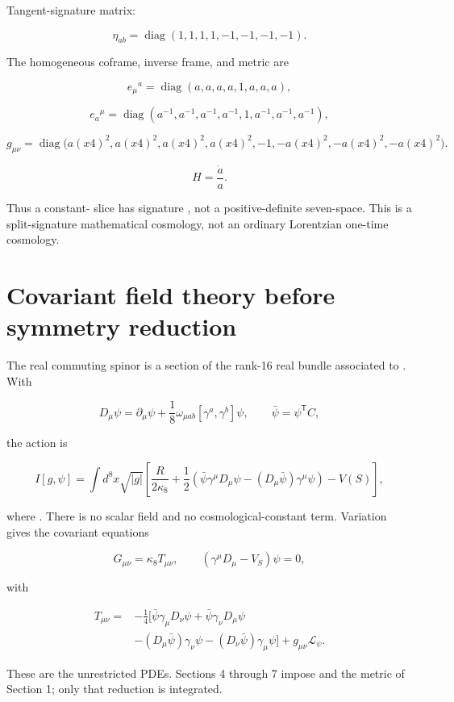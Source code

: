 \documentclass[11pt]{article}
\begin{document}
Tangent-signature matrix:

\[
\eta_{ab}=\operatorname{diag}(1,1,1,1,-1,-1,-1,-1).
\]

The homogeneous coframe, inverse frame, and metric are

\[
e_\mu{}^a=\operatorname{diag}(a,a,a,a,1,a,a,a),
\]

\[
e_a{}^\mu=\operatorname{diag}(a^{-1},a^{-1},a^{-1},a^{-1},1,
a^{-1},a^{-1},a^{-1}),
\]

\[
g_{\mu\nu}=\operatorname{diag}\bigl(a(x4)^2,a(x4)^2,a(x4)^2,a(x4)^2,-1,
-a(x4)^2,-a(x4)^2,-a(x4)^2\bigr).
\]

\[
H=\frac{\dot a}{a}.
\]

Thus a constant-\texttt{} slice has signature \texttt{}, not a positive-definite seven-space. This is a split-signature mathematical cosmology, not an ordinary Lorentzian one-time cosmology.

\section{Covariant field theory before symmetry reduction}

The real commuting spinor is a section of the rank-16 real bundle associated to \texttt{}. With

\[
D_\mu\psi=\partial_\mu\psi+
\frac18\omega_{\mu ab}[\gamma^a,\gamma^b]\psi,
\qquad \bar\psi=\psi^{\mathsf T}C,
\]

the action is

\[
I[g,\psi]=\int d^8x\sqrt{|g|}\left[
\frac{R}{2\kappa_8}
+\frac12\left(\bar\psi\gamma^\mu D_\mu\psi
-(D_\mu\bar\psi)\gamma^\mu\psi\right)-V(S)\right],
\]

where \texttt{}. There is no scalar field and no cosmological-constant term. Variation gives the covariant equations

\[
G_{\mu\nu}=\kappa_8T_{\mu\nu},
\qquad
(\gamma^\mu D_\mu-V_S)\psi=0,
\]

with

\[
\begin{aligned}
T_{\mu\nu}={}&-\frac14\bigl[
\bar\psi\gamma_\mu D_\nu\psi+
\bar\psi\gamma_\nu D_\mu\psi\\
&-(D_\mu\bar\psi)\gamma_\nu\psi
-(D_\nu\bar\psi)\gamma_\mu\psi\bigr]
+g_{\mu\nu}\mathcal L_\psi.
\end{aligned}
\]

These are the unrestricted PDEs. Sections 4 through 7 impose \texttt{} and the metric of Section 1; only that reduction is integrated.
\end{document}
